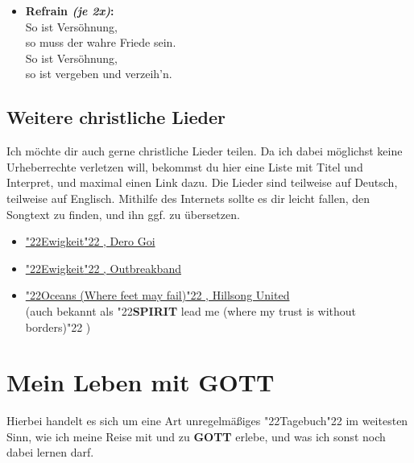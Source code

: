 \documentclass[10pt,a5paper]{article}
\newcommand{\Gott}[0]{\textbf{GOTT}}
\newcommand{\Selbst}[0]{\textbf{SELBST}}
\newcommand{\Spirit}[0]{\textbf{SPIRIT}}
\newcommand{\q}[1]{\char"22{#1}\char"22 }
\begin{document}
\begin{itemize}
			\\		Wie der Fr\"uhling,
					wie der Morgen,
			\\		Wie ein Lied,
					wie ein Gedicht.
			\\		Wie das Leben,
					wie die Liebe,
			\\		Wie {\Gott} {\Selbst},
					das wahre Licht!
			\item	\textbf{Refrain \textit{(je 2x)}:}
			\\		So ist Vers\"ohnung,
			\\		so muss der wahre Friede sein.
			\\		So ist Vers\"ohnung,
			\\		so ist vergeben und verzeih'n.
		\end{itemize}

	\subsection{Weitere christliche Lieder}
		Ich m\"ochte dir auch gerne christliche Lieder teilen.
		Da ich dabei m\"oglichst keine Urheberrechte verletzen will,
		bekommst du hier eine Liste mit Titel und Interpret,
		und maximal einen Link dazu.
		Die Lieder sind teilweise auf Deutsch,
		teilweise auf Englisch.
		Mithilfe des Internets sollte es dir leicht fallen,
		den Songtext zu finden,
		und ihn ggf. zu \"ubersetzen.
		\begin{itemize}[noitemsep]
			\item	\href{https://www.youtube.com/watch?v=Oncj9JBo1xQ}{\q{Ewigkeit},
					Dero Goi}
			\item	\href{https://www.youtube.com/watch?v=PcxaUHkmnSQ}{\q{Ewigkeit},
					Outbreakband }
			\item	\href{https://www.youtube.com/watch?v=DqlpyrHB_Qk}{\q{Oceans (Where feet may fail)},
					Hillsong United}
					\\
					(auch bekannt als \q{{\Spirit} lead me (where my trust is without borders)})
		\end{itemize}

	\newpage
	\section{Mein Leben mit {\Gott}} \label{MeinLebenMitGott}
		Hierbei handelt es sich um eine Art unregelm\"a{\ss}iges \q{Tagebuch} im weitesten Sinn,
		wie ich meine Reise mit und zu {\Gott} erlebe,
		und was ich sonst noch dabei lernen darf.
	
\end{document}
